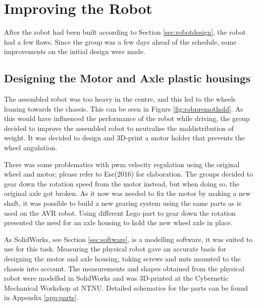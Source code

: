\section{Improving the Robot}
\label{sec:improvements}
After the robot had been built according to Section \ref{sec:robotdesign}, the robot had a few flaws. Since the group was a few days ahead of the schedule, some improvements on the initial design were made.

\subsection{Designing the Motor and Axle plastic housings}
\label{sec:motoraxle}
The assembled robot was too heavy in the centre, and this led to the wheels leaning towards the chassis. This can be seen in Figure \ref{fig:robpremothold}.  As this would have influenced the performance of the robot while driving, the group decided to improve the assembled robot to neutralise the maldistribution of weight. It was decided to design and 3D-print a motor holder that prevents the wheel angulation.

There was some problematics with \acrshort{pwm} velocity regulation using the original wheel and motor; please refer to Ese(2016) for elaboration. The groups decided to gear down the rotation speed from the motor instead, but when doing so, the original axle got broken. As it now was needed to fix the motor by making a new shaft, it was possible to build a new gearing system using the same parts as is used on the AVR robot. Using different Lego part to gear down the rotation presented the need for an axle housing to hold the new wheel axle in place.

As SolidWorks, see Section \ref{sec:software}, is a modelling software, it was suited to use for this task. Measuring the physical robot gave an accurate basis for designing the motor and axle housing, taking screws and nuts mounted to the chassis into account. The measurements and shapes obtained from the physical robot were modelled in SolidWorks and was 3D-printed at the Cybernetic Mechanical Workshop at NTNU. Detailed schematics for the parts can be found in Appendix \ref{app:parts}.


